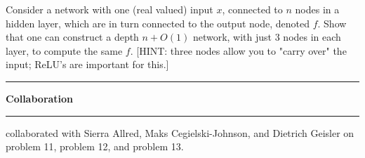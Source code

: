 \documentclass[11pt]{article}
\newcommand\question[2]{\vspace{.25in}\hrule\textbf{#1}\vspace{.5em}\hrule\vspace{.10in}}
\begin{document}
Consider a network with one (real valued) input $x$, connected to $n$ nodes in a hidden layer, which are in turn connected to the output node, denoted $f$. Show that one can construct a depth $n + O(1)$ network, with just 3 nodes in each layer, to compute the same $f$. [HINT: three nodes allow you to "carry over" the input; ReLU's are important for this.]


\newpage

\question{Collaboration}

I collaborated with Sierra Allred, Maks Cegielski-Johnson, and Dietrich Geisler on problem 11, problem 12, and problem 13. \newline
\end{document}
